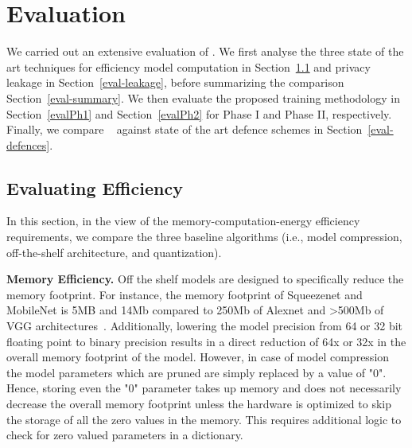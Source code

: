 \section{Evaluation}
\label{compare}

We carried out an extensive evaluation of \method.
We first analyse the three state of the art techniques for efficiency model computation in Section~\ref{eval-efficiency} and privacy leakage in Section~\ref{eval-leakage}, before summarizing the comparison Section~\ref{eval-summary}.
We then evaluate the proposed training methodology in Section~\ref{evalPh1} and Section~\ref{evalPh2} for Phase I and Phase II, respectively.
Finally, we compare \method~ against state of the art defence schemes in Section~\ref{eval-defences}.


\subsection{Evaluating Efficiency}
\label{eval-efficiency}

In this section, in the view of the memory-computation-energy efficiency requirements, we compare the three baseline algorithms (i.e., model compression, off-the-shelf architecture, and quantization).


\noindent\textbf{Memory Efficiency.} Off the shelf models are designed to specifically reduce the memory footprint.
For instance, the memory footprint of Squeezenet and MobileNet is 5MB and 14Mb compared to 250Mb of Alexnet and >500Mb of VGG architectures~\cite{DBLP:journals/corr/IandolaMAHDK16,conf/cvpr/SandlerHZZC18}.
Additionally, lowering the model precision from 64 or 32 bit floating point to binary precision results in a direct reduction of 64x or 32x in the overall memory footprint of the model.
However, in case of model compression the model parameters which are pruned are simply replaced by a value of "0".
Hence, storing even the "0" parameter takes up memory and does not necessarily decrease the overall memory footprint unless the hardware is optimized to skip the storage of all the zero values in the memory.
This requires additional logic to check for zero valued parameters in a dictionary.


